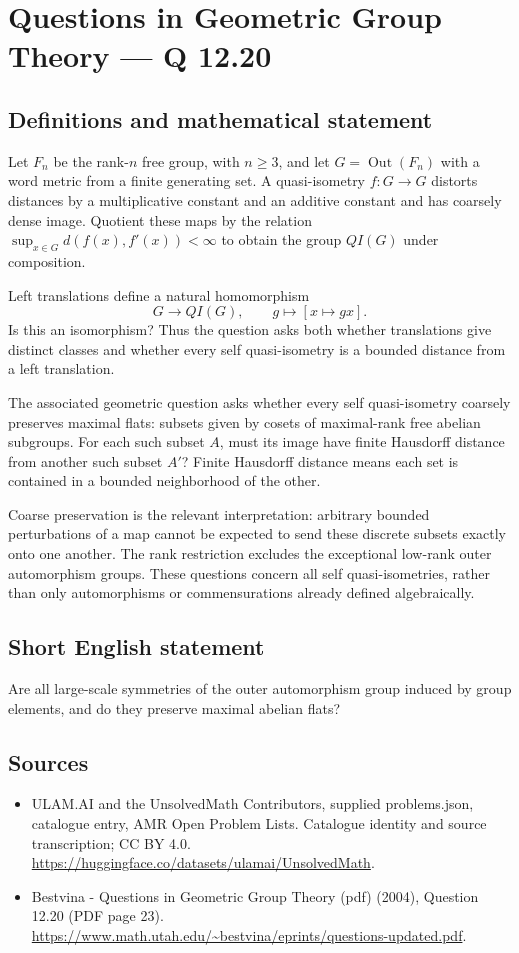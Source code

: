 \documentclass[11pt,a4paper]{article}
\begin{document}
\section*{Questions in Geometric Group Theory — Q 12.20}\label{statement}

\subsection{Definitions and mathematical statement}
Let $F_n$ be the rank-$n$ free group, with $n\geq3$, and let $G=\operatorname{Out}(F_n)$ with a word metric from a finite generating set. A quasi-isometry $f:G\to G$ distorts distances by a multiplicative constant and an additive constant and has coarsely dense image. Quotient these maps by the relation $\sup_{x\in G}d(f(x),f'(x))<\infty$ to obtain the group $QI(G)$ under composition.

Left translations define a natural homomorphism
\[
 G\longrightarrow QI(G),\qquad g\longmapsto [x\mapsto gx].
\]
Is this an isomorphism? Thus the question asks both whether translations give distinct classes and whether every self quasi-isometry is a bounded distance from a left translation.

The associated geometric question asks whether every self quasi-isometry coarsely preserves maximal flats: subsets given by cosets of maximal-rank free abelian subgroups. For each such subset $A$, must its image have finite Hausdorff distance from another such subset $A'$? Finite Hausdorff distance means each set is contained in a bounded neighborhood of the other.

Coarse preservation is the relevant interpretation: arbitrary bounded perturbations of a map cannot be expected to send these discrete subsets exactly onto one another. The rank restriction excludes the exceptional low-rank outer automorphism groups. These questions concern all self quasi-isometries, rather than only automorphisms or commensurations already defined algebraically.
\subsection{Short English statement}
Are all large-scale symmetries of the outer automorphism group induced by group elements, and do they preserve maximal abelian flats?
\subsection{Sources}
\begin{itemize}
\item[S1] ULAM.AI and the UnsolvedMath Contributors, supplied problems.json, catalogue entry, AMR Open Problem Lists. Catalogue identity and source transcription; CC BY 4.0.
\url{https://huggingface.co/datasets/ulamai/UnsolvedMath}.
\item[S2] Bestvina - Questions in Geometric Group Theory (pdf) (2004), Question 12.20 (PDF page 23). 
\url{https://www.math.utah.edu/~bestvina/eprints/questions-updated.pdf}.
\end{itemize}
\end{document}
